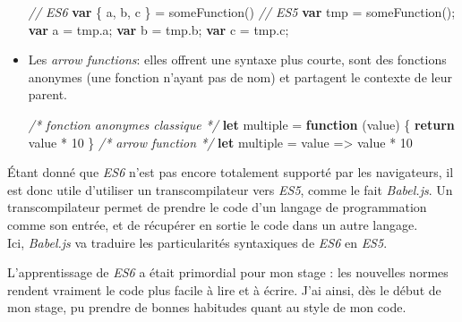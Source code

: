 \documentclass[12pt,a4paper]{article}
\newenvironment{Shaded}{}{}
\newcommand{\KeywordTok}[1]{\textcolor[rgb]{0.00,0.44,0.13}{\textbf{{#1}}}}
\newcommand{\DecValTok}[1]{\textcolor[rgb]{0.25,0.63,0.44}{{#1}}}
\newcommand{\CommentTok}[1]{\textcolor[rgb]{0.38,0.63,0.69}{\textit{{#1}}}}
\newcommand{\VariableTok}[1]{\textcolor[rgb]{0.10,0.09,0.49}{{#1}}}
\newcommand{\ControlFlowTok}[1]{\textcolor[rgb]{0.00,0.44,0.13}{\textbf{{#1}}}}
\newcommand{\OperatorTok}[1]{\textcolor[rgb]{0.40,0.40,0.40}{{#1}}}
\newcommand{\AttributeTok}[1]{\textcolor[rgb]{0.49,0.56,0.16}{{#1}}}
\newcommand{\NormalTok}[1]{{#1}}
\begin{document}
\begin{itemize}
  \begin{Shaded}
  \begin{Highlighting}[]
  \CommentTok{// ES6}
  \KeywordTok{var} \OperatorTok{\{} \NormalTok{a}\OperatorTok{,} \NormalTok{b}\OperatorTok{,} \NormalTok{c }\OperatorTok{\}} \OperatorTok{=} \AttributeTok{someFunction}\NormalTok{()}
  \CommentTok{// ES5}
  \KeywordTok{var} \NormalTok{tmp }\OperatorTok{=} \AttributeTok{someFunction}\NormalTok{()}\OperatorTok{;}
  \KeywordTok{var} \NormalTok{a  }\OperatorTok{=} \VariableTok{tmp}\NormalTok{.}\AttributeTok{a}\OperatorTok{;}
  \KeywordTok{var} \NormalTok{b }\OperatorTok{=} \VariableTok{tmp}\NormalTok{.}\AttributeTok{b}\OperatorTok{;}
  \KeywordTok{var} \NormalTok{c }\OperatorTok{=} \VariableTok{tmp}\NormalTok{.}\AttributeTok{c}\OperatorTok{;}
  \end{Highlighting}
  \end{Shaded}
  \item
    Les \emph{arrow functions}: elles offrent une syntaxe plus courte,
    sont des fonctions anonymes (une fonction n'ayant pas de nom) et
    partagent le contexte de leur parent.

  \begin{Shaded}
  \begin{Highlighting}[]
  \CommentTok{/* fonction anonymes classique */}
  \KeywordTok{let} \NormalTok{multiple }\OperatorTok{=} \KeywordTok{function} \NormalTok{(value) }\OperatorTok{\{}
    \ControlFlowTok{return} \NormalTok{value }\OperatorTok{*} \DecValTok{10}
  \OperatorTok{\}}
  \CommentTok{/* arrow function */}
  \KeywordTok{let} \NormalTok{multiple }\OperatorTok{=} \NormalTok{value }\OperatorTok{=>} \NormalTok{value }\OperatorTok{*} \DecValTok{10}
  \end{Highlighting}
  \end{Shaded}
  \end{itemize}

  \bigskip

  Étant donné que \emph{ES6} n'est pas encore totalement supporté par les
  navigateurs, il est donc utile d'utiliser un transcompilateur vers
  \emph{ES5}, comme le fait \emph{Babel.js}. Un transcompilateur permet de
  prendre le code d'un langage de programmation comme son entrée, et de
  récupérer en sortie le code dans un autre langage.\\
  Ici, \emph{Babel.js} va traduire les particularités syntaxiques de
  \emph{ES6} en \emph{ES5}.

  \bigskip

  L'apprentissage de \emph{ES6} a était primordial pour mon stage : les
  nouvelles normes rendent vraiment le code plus facile à lire et à
  écrire. J'ai ainsi, dès le début de mon stage, pu prendre de bonnes
  habitudes quant au style de mon code.
\end{document}
